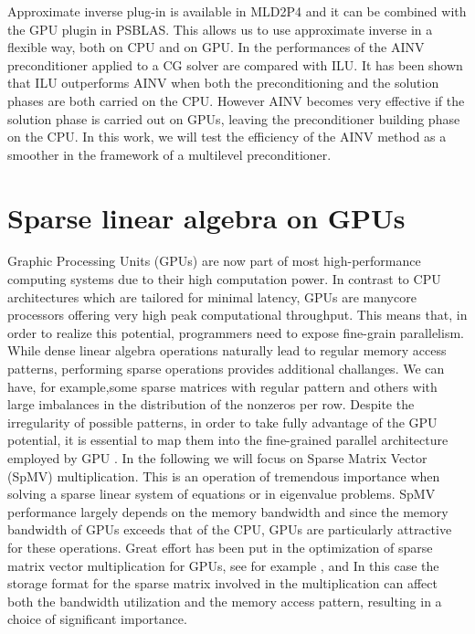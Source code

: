 \documentclass[conference]{IEEEtran}
\begin{document}
Approximate inverse plug-in is available in MLD2P4 and it can be combined with the GPU plugin in PSBLAS. This allows us to use approximate inverse in a flexible way, both on CPU and on GPU. In \cite{bertaccini2014approximate} the performances of the AINV preconditioner applied to a CG solver are compared with ILU. It has been shown that ILU outperforms AINV when both the preconditioning and the solution phases are both carried on the CPU. However AINV becomes very effective if the solution phase is carried out on GPUs, leaving the preconditioner building phase on the CPU.
In this work, we will test the efficiency of the AINV method as a smoother in the framework of a multilevel preconditioner. 

\section{Sparse linear algebra on GPUs}
Graphic Processing Units (GPUs) are now part of most high-performance computing systems due to their high computation power.  
In contrast to CPU architectures which are tailored for minimal latency, GPUs are manycore processors offering very high peak computational throughput. This means that, in order to realize this potential, programmers need to expose fine-grain parallelism. While dense linear algebra operations naturally lead to regular memory access patterns, performing sparse operations provides additional challanges. We can have, for example,some sparse matrices with regular pattern and others with large imbalances in the distribution of the nonzeros per row. Despite the irregularity of possible patterns, in order to take fully advantage of the GPU potential, it is essential to map them into the fine-grained parallel architecture employed by GPU \cite{bell2008efficient}. 
In the following we will focus on Sparse Matrix Vector (SpMV) multiplication. This is an operation of tremendous importance when solving a sparse linear system of equations or in eigenvalue problems. SpMV performance largely depends on the memory bandwidth and since the memory bandwidth of GPUs exceeds that of the CPU, GPUs are particularly attractive for these operations. Great effort has been put in the optimization of sparse matrix vector multiplication for GPUs, see for example \cite{bell2009implementing}, 
\cite{monakov2010automatically} and \cite{filippone2017sparse} 
In this case the storage format for the sparse matrix involved in the multiplication can affect both the bandwidth utilization and the memory access pattern, resulting in a choice of significant importance.   
\end{document}
